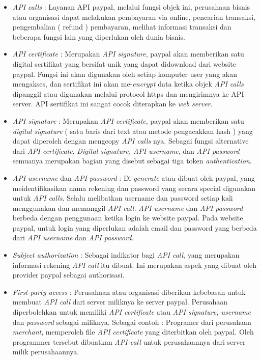 \begin{itemize}
\item \textit{API calls} : Layanan API paypal, melalui fungsi objek ini, perusahaan bisnis atau organisasi dapat melakukan pembayaran via online, pencarian transaksi, pengembalian ( refund ) pembayaran, melihat informasi transaksi dan beberapa fungsi lain yang diperlukan oleh dunia bisnis.
\item \textit{API certificate} : Merupakan \textit{API signature}, paypal akan memberikan satu digital sertifikat yang bersifat unik yang dapat didownload dari website paypal. Fungsi ini akan digunakan oleh setiap komputer user yang akan mengakses, dan sertifikat ini akan me-\textit{encrypt} data ketika objek \textit{API calls} dipanggil atau digunakan melalui protocol https dan mengirimnya ke API server.
API sertifikat ini sangat cocok diterapkan ke \textit{web server}.
\item \textit{API signature} : Merupakan \textit{API certificate}, paypal akan memberikan satu \textit{digital signature} ( satu baris dari text atau metode pengacakkan hash ) yang dapat diperoleh dengan mengcopy \textit{API calls} nya. Sebagai fungsi alternative dari \textit{API certificate}.
\textit{Digital signature, API username}, dan \textit{API password} semuanya merupakan bagian yang disebut sebagai tiga token \textit{authentication}.
\item \textit{API username }dan
\textit{API password} : Di \textit{generate} atau dibuat oleh paypal, yang meidentifikasikan nama rekening dan password yang secara special digunakan untuk \textit{API calls}.
Selalu melibatkan username dan password setiap kali menggunakan dan memanggil\textit{ API call.}
\textit{API username }dan \textit{API password} berbeda dengan penggunaan ketika login ke website paypal. Pada website paypal, untuk login yang diperlukan adalah email dan password yang berbeda dari \textit{API username} dan \textit{API password.}
\item \textit{Subject authorization} : Sebagai indikator bagi \textit{API call}, yang merupakan informasi rekening \textit{API call} itu dibuat.
Ini merupakan aspek yang dibuat oleh provider paypal sebagai authorisasi.
\item \textit{First-party access} : Perusahaan atau organisasi diberikan kebebasan untuk membuat \textit{API call} dari server miliknya ke server paypal.
Perusahaan diperbolehkan untuk memiliki \textit{API certificate }atau \textit{API signature, username} dan \textit{password} sebagai miliknya.
Sebagai contoh :
Programer dari perusahaan \textit{merchant}, memperoleh file \textit{API certificate} yang diterbitkan oleh paypal. Oleh programmer tersebut dibuatkan \textit{API call} untuk perusahaannya dari server milik perusahaannya.
\end{itemize}
